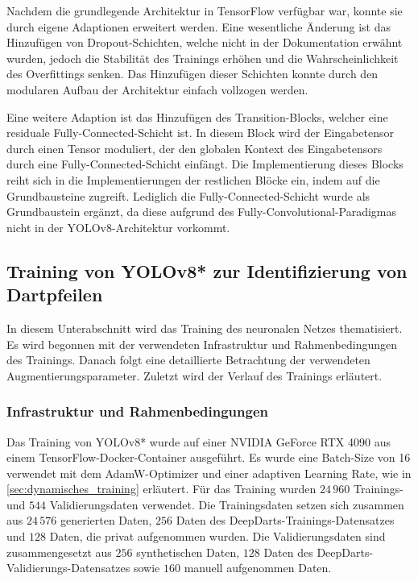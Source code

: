 Nachdem die grundlegende Architektur in TensorFlow verfügbar war, konnte sie durch eigene Adaptionen erweitert werden. Eine wesentliche Änderung ist das Hinzufügen von Dropout-Schichten, welche nicht in der Dokumentation erwähnt wurden, jedoch die Stabilität des Trainings erhöhen und die Wahrscheinlichkeit des Overfittings senken. Das Hinzufügen dieser Schichten konnte durch den modularen Aufbau der Architektur einfach vollzogen werden.

Eine weitere Adaption ist das Hinzufügen des Transition-Blocks, welcher eine residuale Fully-Connected-Schicht ist. In diesem Block wird der Eingabetensor durch einen Tensor moduliert, der den globalen Kontext des Eingabetensors durch eine Fully-Connected-Schicht einfängt. Die Implementierung dieses Blocks reiht sich in die Implementierungen der restlichen Blöcke ein, indem auf die Grundbausteine zugreift. Lediglich die Fully-Connected-Schicht wurde als Grundbaustein ergänzt, da diese aufgrund des Fully-Convolutional-Paradigmas nicht in der YOLOv8-Architektur vorkommt.


\subsection{Training von YOLOv8* zur Identifizierung von Dartpfeilen}
\label{sec:training}

In diesem Unterabschnitt wird das Training des neuronalen Netzes thematisiert. Es wird begonnen mit der verwendeten Infrastruktur und Rahmenbedingungen des Trainings. Danach folgt eine detaillierte Betrachtung der verwendeten Augmentierungsparameter. Zuletzt wird der Verlauf des Trainings erläutert.

\subsubsection{Infrastruktur und Rahmenbedingungen}

Das Training von YOLOv8* wurde auf einer NVIDIA GeForce RTX 4090 aus einem TensorFlow-Docker-Container ausgeführt. Es wurde eine Batch-Size von 16 verwendet mit dem AdamW-Optimizer und einer adaptiven Learning Rate, wie in \autoref{sec:dynamisches_training} erläutert. Für das Training wurden $24\,960$ Trainings- und $544$ Validierungsdaten verwendet. Die Trainingsdaten setzen sich zusammen aus $24\,576$ generierten Daten, $256$ Daten des DeepDarts-Trainings-Datensatzes und $128$ Daten, die privat aufgenommen wurden. Die Validierungsdaten sind zusammengesetzt aus $256$ synthetischen Daten, $128$ Daten des DeepDarts-Validierungs-Datensatzes sowie $160$ manuell aufgenommen Daten.


